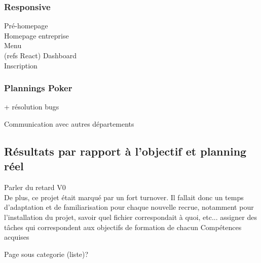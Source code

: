 \subsubsection{Responsive}
Pré-homepage\\
Homepage entreprise\\
Menu\\ (refs React)
Dashboard\\
Inscription

\subsubsection{Plannings Poker}


+ résolution bugs

Communication avec autres départements

\pagebreak
\subsection{Résultats par rapport à l'objectif et planning réel}

Parler du retard V0
\\De plus, ce projet était marqué par un fort turnover. Il fallait donc un temps d'adaptation et de familiarisation pour chaque nouvelle recrue, notamment pour l'installation du projet, savoir quel fichier correspondait à quoi, etc...
assigner des tâches qui correspondent aux objectifs de formation de chacun
Compétences acquises

Page sous categorie (liste)?





